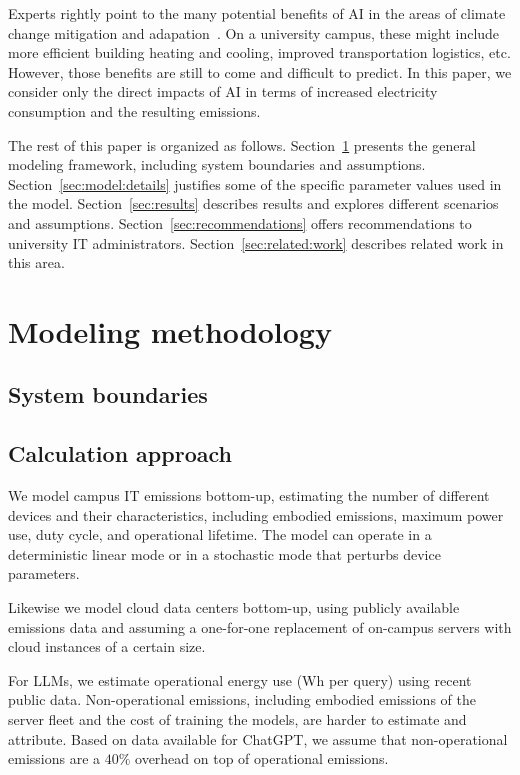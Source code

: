 \documentclass[11pt]{article}
\begin{document}
Experts rightly point to the many potential benefits of AI in the areas of climate change mitigation and adapation~\cite{climate:change:ai}. On a university campus, these might include more efficient building heating and cooling, improved transportation logistics, etc. However, those benefits are still to come and difficult to predict. In this paper, we consider only the direct impacts of AI in terms of increased electricity consumption and the resulting emissions.

The rest of this paper is organized as follows. Section~\ref{sec:model:methodology} presents the general modeling framework, including system boundaries and assumptions. Section~\ref{sec:model:details} justifies some of the specific parameter values used in the model. Section~\ref{sec:results} describes results and explores different scenarios and assumptions. Section~\ref{sec:recommendations} offers recommendations to university IT administrators. Section~\ref{sec:related:work} describes related work in this area.

\section{Modeling methodology}
\label{sec:model:methodology}



\subsection{System boundaries}

\subsection{Calculation approach}

We model campus IT emissions bottom-up, estimating the number of different devices and their characteristics, including embodied emissions, maximum power use, duty cycle, and operational lifetime. The model can operate in a deterministic linear mode or in a stochastic mode that perturbs device parameters.

Likewise we model cloud data centers bottom-up, using publicly available emissions data and assuming a one-for-one replacement of on-campus servers with cloud instances of a certain size.

For LLMs, we estimate operational energy use (Wh per query) using recent public data. Non-operational emissions, including embodied emissions of the server fleet and the cost of training the models, are harder to estimate and attribute. Based on data available for ChatGPT, we assume that non-operational emissions are a $40\%$ overhead on top of operational emissions.
\end{document}

